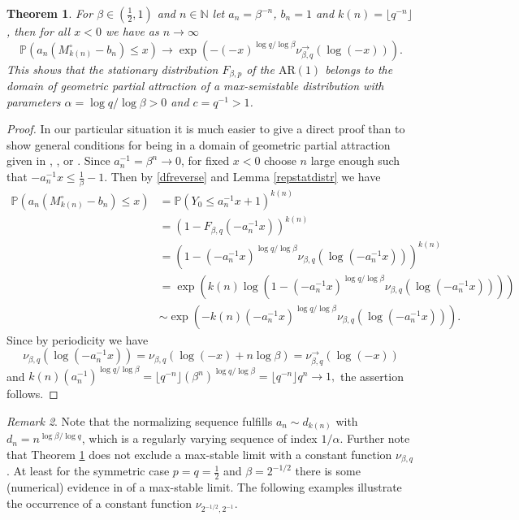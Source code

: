 \documentclass[12pt]{amsart}
\newtheorem{theorem}{Theorem}[section]
\theoremstyle{definition}
\theoremstyle{remark}
\newtheorem{remark}[theorem]{Remark}
\newcommand{\nat}{{\mathbb N}}
\newcommand{\AR}{\operatorname{AR(1)}}
\newcommand{\Pm}{{\mathbb P}}
\numberwithin{equation}{section}
\begin{document}
\begin{theorem}\label{maxsdoa}
For $\beta\in(\frac12,1)$ and $n\in\nat$ let $a_{n}=\beta^{-n}$, $b_{n}=1$ and $k(n)=\lfloor q^{-n}\rfloor$, then for all $x<0$ we have as $n\to\infty$
$$\Pm\left(a_{n}(M_{k(n)}^{\circ}-b_{n})\leq x\right)\to\exp\left(-(-x)^{\log q/\log\beta}\nu_{\beta,q}^{\to}(\log(-x))\right).$$
This shows that the stationary distribution $F_{\beta,p}$ of the $\AR$ belongs to the domain of geometric partial attraction of a max-semistable distribution with parameters $\alpha=\log q/\log\beta>0$ and $c=q^{-1}>1$.
\end{theorem}

\begin{proof}
In our particular situation it is much easier to give a direct proof than to show general conditions for being in a domain of geometric partial attraction given in \cite{Gri2}, \cite{Megyesi}, or \cite{CHT}.
Since $a_{n}^{-1}=\beta^{n}\to0$, for fixed $x<0$ choose $n$ large enough such that $-a_{n}^{-1}x\leq\frac1{\beta}-1$. Then by \eqref{dfreverse} and Lemma \ref{repstatdistr} we have
\begin{align*}
\Pm\left(a_{n}(M_{k(n)}^{\circ}-b_{n})\leq x\right) & =\Pm(Y_{0}\leq a_{n}^{-1}x+1)^{k(n)}\\
& =\left(1-F_{\beta,q}(-a_{n}^{-1}x)\right)^{k(n)}\\
& =\left(1-(-a_{n}^{-1}x)^{\log q/\log\beta}\nu_{\beta,q}(\log(-a_{n}^{-1}x))\right)^{k(n)}\\
& =\exp\left(k(n)\log\left(1-(-a_{n}^{-1}x)^{\log q/\log\beta}\nu_{\beta,q}(\log(-a_{n}^{-1}x))\right)\right)\\
& \sim\exp\left(-k(n)(-a_{n}^{-1}x)^{\log q/\log\beta}\nu_{\beta,q}(\log(-a_{n}^{-1}x))\right).
\end{align*}
Since by periodicity we have
$$\nu_{\beta,q}(\log(-a_{n}^{-1}x))=\nu_{\beta,q}(\log(-x)+n\log\beta)=\nu_{\beta,q}^{\to}(\log(-x))$$
and
$k(n)(a_{n}^{-1})^{\log q/\log\beta}=\lfloor q^{-n}\rfloor(\beta^{n})^{\log q/\log\beta}=\lfloor q^{-n}\rfloor q^{n}\to1,$
the assertion follows.
\end{proof}

\begin{remark}\label{rem}
Note that the normalizing sequence fulfills $a_{n}\sim d_{k(n)}$ with $d_{n}=n^{\log \beta/\log q}$, which is a regularly varying sequence of index $1/\alpha$. Further note that Theorem \ref{maxsdoa} does not exclude a max-stable limit with a constant function $\nu_{\beta,q}$. At least for the symmetric case $p=q=\frac12$ and $\beta=2^{-1/2}$ there is some (numerical) evidence in \cite{Sol2} of a max-stable limit. The following examples illustrate the occurrence of a constant function $\nu_{2^{-1/2},2^{-1}}$.
\end{remark}
\end{document}
